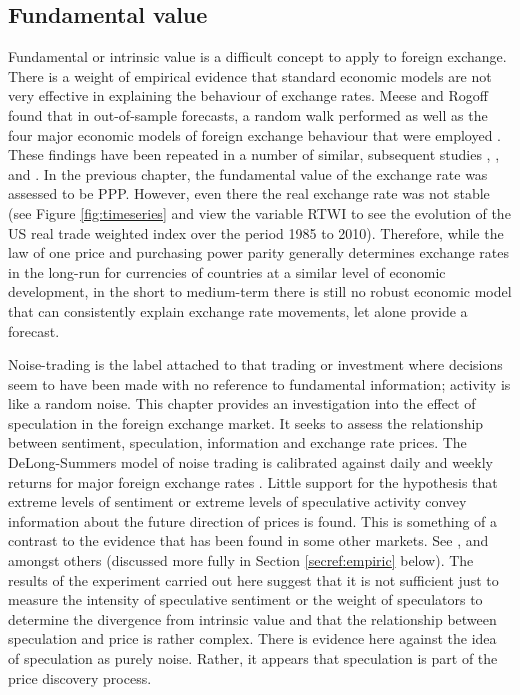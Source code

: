 \documentclass[12pt, a4paper, oneside]{article} %
\begin{document}
\subsection{Fundamental value}
Fundamental or intrinsic value is a difficult concept to apply to foreign exchange.     There is a weight of empirical evidence that standard economic models are not very effective in explaining the behaviour of exchange rates.  Meese and Rogoff found that in out-of-sample forecasts, a random walk performed as well as the four major economic models of foreign exchange behaviour that were employed \citep{Meese1983Empirical}.  These findings have been repeated in a number of similar, subsequent studies  \citep{Frankel1984tests},  \citep{Frankel1990Exchange}, \citep{Lyons1995Microstructure} and \citep{Sarno2006}.  In the previous chapter, the fundamental value of the exchange rate was assessed to be PPP.  However, even there the real exchange rate was not stable (see Figure \ref{fig:timeseries} and view the variable RTWI to see the evolution of the US real trade weighted index over the period 1985 to 2010).  Therefore, while the law of one price and purchasing power parity generally determines exchange rates in the long-run for currencies of countries at a similar level of economic development, in the short to medium-term there is still no robust economic model that can consistently explain exchange rate movements, let alone provide a forecast.   

Noise-trading is the label attached to that trading or investment where decisions seem to have been made with no reference to fundamental information; activity is like a random noise.  This chapter provides an investigation into the effect of speculation in the foreign exchange market.  It seeks to assess the relationship between sentiment, speculation, information and exchange rate prices.  The DeLong-Summers model of noise trading is calibrated against daily and weekly returns for major foreign exchange rates \citep{Delong1990noise}.  Little support for the hypothesis that extreme levels of sentiment or extreme levels of speculative activity convey information about the future direction of prices is found.  This is something of a contrast to the evidence that has been found in some other markets.  See  \citep{DeBondtOver}, \citep{Chopra1992} and \citep{SteinOptions} amongst others (discussed more fully in Section \ref{secref:empiric} below).   The results of the experiment carried out here suggest that it is not sufficient just to measure the intensity of speculative sentiment or the weight of speculators to determine the divergence from intrinsic value and that the relationship between speculation and price is rather complex.  There is evidence here against the idea of speculation as purely noise.  Rather, it appears that speculation is part of the price discovery process. 
\end{document}
